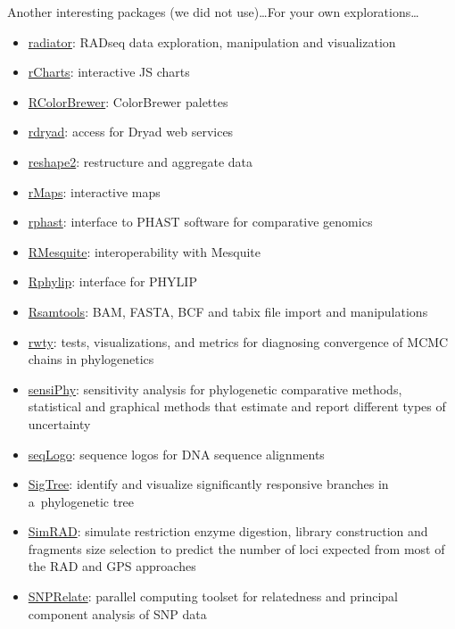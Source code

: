 \documentclass[compress, ucs, xelatex, 11pt, xcolor=svgnames, aspectratio=169,
	hyperref={
		bookmarks=true,
		unicode=true,
		colorlinks=true,
		pdftitle={Molecular data in R},
		plainpages=false,
		pdfauthor={Vojtech Zeisek},
		pdfsubject={Course about phylogeny and evolution in R},
		pdfcreator={XeLaTeX},
		pdfkeywords={R, evolution, phylogeny, molecular data},
		linkcolor=Crimson, %
		anchorcolor=Magenta, %
		citecolor=Magenta, %
		filecolor=Magenta, %
		menucolor=Magenta, %
		urlcolor=DodgerBlue, %
		pdftex},
	url={hyphens, lowtilde} %
	]{beamer}
\begin{document}
\begin{frame}[allowframebreaks]{Another interesting packages (we did not use)\ldots}{For your own explorations\ldots}
\begin{itemize}
		\item \href{https://github.com/thierrygosselin/radiator}{radiator}: RADseq data exploration, manipulation and visualization
		\item \href{https://github.com/ramnathv/rCharts}{rCharts}: interactive JS charts
		\item \href{https://CRAN.R-project.org/package=RColorBrewer}{RColorBrewer}: ColorBrewer palettes
		\item \href{https://CRAN.R-project.org/package=rdryad}{rdryad}: access for Dryad web services
		\item \href{https://CRAN.R-project.org/package=reshape2}{reshape2}: restructure and aggregate data
		\item \href{https://github.com/ramnathv/rMaps}{rMaps}: interactive maps
		\item \href{https://github.com/CshlSiepelLab/RPHAST}{rphast}: interface to PHAST software for comparative genomics
		\item \href{https://r-forge.r-project.org/projects/rmesquite/}{RMesquite}: interoperability with Mesquite
		\item \href{https://CRAN.R-project.org/package=Rphylip}{Rphylip}: interface for PHYLIP
		\item \href{https://bioconductor.org/packages/release/bioc/html/Rsamtools.html}{Rsamtools}: BAM, FASTA, BCF and tabix file import and manipulations
		\item \href{https://CRAN.R-project.org/package=rwty}{rwty}: tests, visualizations, and metrics for diagnosing convergence of MCMC chains in phylogenetics
		\item \href{https://CRAN.R-project.org/package=sensiPhy}{sensiPhy}: sensitivity analysis for phylogenetic comparative methods,  statistical and graphical methods that estimate and report different types of uncertainty
		\item \href{https://www.bioconductor.org/packages/release/bioc/html/seqLogo.html}{seqLogo}: sequence logos for DNA sequence alignments
		\item \href{https://CRAN.R-project.org/package=SigTree}{SigTree}: identify and visualize significantly responsive branches in a~phylogenetic tree
		\item \href{https://CRAN.R-project.org/package=SimRAD}{SimRAD}: simulate restriction enzyme digestion, library construction and fragments size selection to predict the number of loci expected from most of the RAD and GPS approaches
		\item \href{https://www.bioconductor.org/packages/release/bioc/html/SNPRelate.html}{SNPRelate}: parallel computing toolset for relatedness and principal component analysis of SNP data

\end{itemize}
\end{frame}
\end{document}

